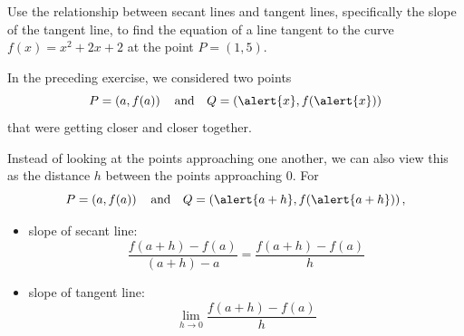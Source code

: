 \documentclass[Cal1Spr16Lectures.tex]{subfiles}
\begin{document}
\begin{frame}
\begin{exe} Use the relationship between secant lines and tangent lines, specifically the slope of the tangent line, to find the equation of a line tangent to the curve $f(x)=x^2+2x+2$ at the point $P=(1,5)$.
\end{exe}
\end{frame}

\begin{frame}{}
In the preceding exercise, we considered two points 
\vspace{-0.6pc}
\[P=\left(a,f(a)\right)\quad\text{and}\quad Q=\left(\alert{x},f(\alert{x})\right)\]
that were getting closer and closer together.

\vspace{2pc}
Instead of looking at the points approaching one another, we can also view this as the distance $h$ between the points approaching 0.  For 
\vspace{-0.5pc}
\[P=\left(a,f(a)\right)\quad\text{and}\quad Q=\left(\alert{a+h},f(\alert{a+h})\right),\]
\end{frame}

\begin{frame}
\begin{itemize}
\item slope of secant line:  
\[\frac{f(a+h)-f(a)}{(a+h)-a}= \dfrac{f(a+h)-f(a)}{h}\]
\item slope of tangent line:  
\[\lim_{h \to 0} \frac{f(a+h)-f(a)}{h}\]
\end{itemize}
\end{frame}

\begin{frame}
\end{frame}
\end{document}
